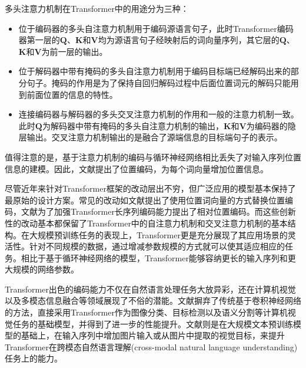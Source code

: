 多头注意力机制在Transformer中的用途分为三种：
\begin{itemize}
    \item 位于编码器的多头自注意力机制用于编码源语言句子，此时Transformer编码器第一层的$\boldsymbol{Q}$、$\boldsymbol{K}$和$\boldsymbol{V}$均为源语言句子经映射后的词向量序列，其它层的$\boldsymbol{Q}$、$\boldsymbol{K}$和$\boldsymbol{V}$为前一层的输出。
    \item 位于解码器中带有掩码的多头自注意力机制用于编码目标端已经解码出来的部分句子。掩码的作用是为了保持自回归解码过程中后面位置词元的解码只能用到前面位置的信息的特性。
    \item 连接编码器与解码器的多头交叉注意力机制的作用和一般的注意力机制一致。此时$\boldsymbol{Q}$为解码器中带有掩码的多头自注意力机制的输出，$\boldsymbol{K}$和$\boldsymbol{V}$为编码器的隐层输出。交叉注意力机制输出的是融合了源端信息的目标端句子的表示。
\end{itemize}
值得注意的是，基于注意力机制的编码与循环神经网络相比丢失了对输入序列位置信息的建模。因此，文献\cite{5_DBLP:journals/corr/VaswaniSPUJGKP17}提出了位置编码，为每个词向量增加位置信息。%

尽管近年来针对Transformer框架的改动层出不穷，但广泛应用的模型基本保持了最原始的设计方案。常见的改动如文献\cite{7_DBLP:conf/naacl/DevlinCLT19}提出了使用位置词向量的方式替换位置编码，文献\cite{8_DBLP:journals/corr/abs-1803-02155,9_DBLP:journals/corr/abs-1901-02860}为了加强Transformer长序列编码能力提出了相对位置编码。而这些创新性的改动基本都保留了Transformer中的自注意力机制和交叉注意力机制的基本结构。在大规模预训练任务的表现上，Transformer更是充分展现了其应用场景的灵活性。针对不同规模的数据，通过增减参数规模的方式就可以使其适应相应的任务。相比于基于循环神经网络的模型，Transformer能够容纳更长的输入序列和更大规模的网络参数。

Transformer出色的编码能力不仅在自然语言处理任务大放异彩，还在计算机视觉以及多模态信息融合等领域展现了不俗的潜能。文献\cite{10_DBLP:journals/corr/abs-1802-05751,11_DBLP:conf/iclr/DosovitskiyB0WZ21,12_DBLP:conf/iccv/LiuL00W0LG21,13_DBLP:conf/iccv/0007CWYSJTFY21}摒弃了传统基于卷积神经网络的方法，直接采用Transformer作为图像分类、目标检测以及语义分割等计算机视觉任务的基础模型，并得到了进一步的性能提升。文献\cite{14_DBLP:conf/nips/LuBPL19,15_DBLP:conf/eccv/ChenLYK0G0020,16_DBLP:journals/corr/abs-2004-00849,17_DBLP:conf/icml/KimSK21}则是在大规模文本预训练模型的基础上，在输入序列中增加图片输入或从图片中提取的视觉目标，来提升Transformer在跨模态自然语言理解(cross-modal natural language understanding)任务上的能力。


